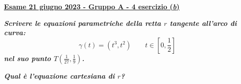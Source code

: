 \documentclass[a4paper]{article}
\newcommand{\definition}[1]{\textcolor{Red3}{\textbf{#1}}}
\newcommand{\example}[1]{\textcolor{Green4}{\textbf{#1}}}
\begin{document}
	\begin{flushleft}
		\label{exam: esame 21 giugno 2023 - Gruppo A - 4 esercizio (b)}
		\hypertarget{
			exam: esame 21 giugno 2023 - Gruppo A - 4 esercizio (b)
		}{
			\definition{\underline{Esame 21 giugno 2023 - Gruppo A - 4 esercizio (\emph{b})}}
		}
	\end{flushleft}
	\example{\emph{Scrivere le equazioni parametriche della retta $r$ tangente all'arco di curva:}
	\begin{equation*}
		\gamma\left(t\right) = \left(t^{3}, t^{2}\right) \hspace{2em} t \in \left[0, \frac{1}{2}\right]
	\end{equation*}
	\emph{nel suo punto $T\left(\frac{1}{27}, \frac{1}{9}\right)$.}}

	\noindent
	\example{\emph{Qual è l'equazione cartesiana di $r$?}}\newline
\end{document}

